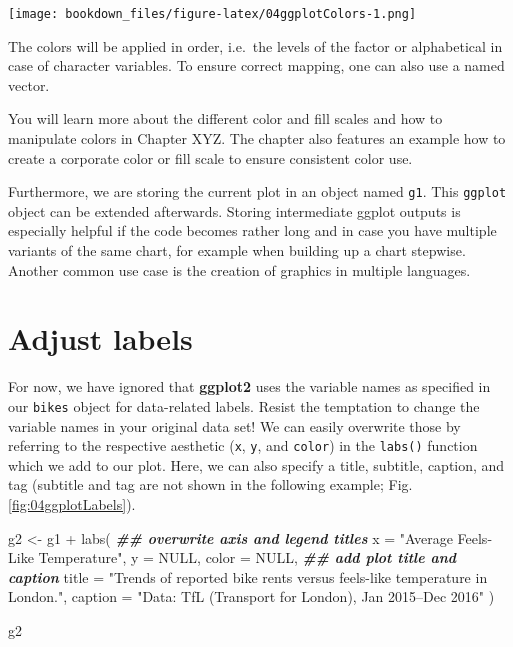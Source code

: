 \documentclass[
]{krantz}
\makeatletter
\newenvironment{Shaded}{\begin{snugshade}}{\end{snugshade}}
\newcommand{\AttributeTok}[1]{\textcolor[rgb]{0.61,0.61,0.61}{#1}}
\newcommand{\ConstantTok}[1]{\textcolor[rgb]{0,0,0}{#1}}
\newcommand{\DocumentationTok}[1]{\textcolor[rgb]{0.37,0.37,0.37}{\textbf{\textit{#1}}}}
\newcommand{\FunctionTok}[1]{\textcolor[rgb]{0,0,0}{#1}}
\newcommand{\NormalTok}[1]{#1}
\newcommand{\OtherTok}[1]{\textcolor[rgb]{0.37,0.37,0.37}{#1}}
\newcommand{\SpecialCharTok}[1]{\textcolor[rgb]{0,0,0}{#1}}
\newcommand{\StringTok}[1]{\textcolor[rgb]{0.5,0.5,0.5}{#1}}
\newenvironment{kframe}{%
\medskip{}
\setlength{\fboxsep}{.8em}
 \def\at@end@of@kframe{}%
 \ifinner\ifhmode%
  \def\at@end@of@kframe{\end{minipage}}%
  \begin{minipage}{\columnwidth}%
 \fi\fi%
 \def\FrameCommand##1{\hskip\@totalleftmargin \hskip-\fboxsep
 \colorbox{shadecolor}{##1}\hskip-\fboxsep
     \hskip-\linewidth \hskip-\@totalleftmargin \hskip\columnwidth}%
 \MakeFramed {\advance\hsize-\width
   \@totalleftmargin\z@ \linewidth\hsize
   \@setminipage}}%
 {\par\unskip\endMakeFramed%
 \at@end@of@kframe}
\renewenvironment{Shaded}{\begin{kframe}}{\end{kframe}}
\makeatother
\begin{document}
\texttt{[image: bookdown\_files/figure-latex/04ggplotColors-1.png]}

The colors will be applied in order, i.e.~the levels of the factor or alphabetical in case of character variables. To ensure correct mapping, one can also use a named vector.

You will learn more about the different color and fill scales and how to manipulate colors in Chapter XYZ. The chapter also features an example how to create a corporate color or fill scale to ensure consistent color use.

Furthermore, we are storing the current plot in an object named \texttt{g1}. This \texttt{ggplot} object can be extended afterwards. Storing intermediate ggplot outputs is especially helpful if the code becomes rather long and in case you have multiple variants of the same chart, for example when building up a chart stepwise. Another common use case is the creation of graphics in multiple languages.

\hypertarget{label-adjustment}{%
\section{Adjust labels}\label{label-adjustment}}

For now, we have ignored that \textbf{ggplot2} uses the variable names as specified in our \texttt{bikes} object for data-related labels. Resist the temptation to change the variable names in your original data set! We can easily overwrite those by referring to the respective aesthetic (\texttt{x}, \texttt{y}, and \texttt{color}) in the \texttt{labs()} function which we add to our plot. Here, we can also specify a title, subtitle, caption, and tag (subtitle and tag are not shown in the following example; Fig. \ref{fig:04ggplotLabels}).

\begin{Shaded}
\begin{Highlighting}[]
\NormalTok{g2 }\OtherTok{\textless{}{-}}\NormalTok{ g1 }\SpecialCharTok{+}
  \FunctionTok{labs}\NormalTok{(}
    \DocumentationTok{\#\# overwrite axis and legend titles}
    \AttributeTok{x =} \StringTok{"Average Feels{-}Like Temperature"}\NormalTok{, }\AttributeTok{y =} \ConstantTok{NULL}\NormalTok{, }\AttributeTok{color =} \ConstantTok{NULL}\NormalTok{,}
    \DocumentationTok{\#\# add plot title and caption}
    \AttributeTok{title =} \StringTok{"Trends of reported bike rents versus feels{-}like temperature in London."}\NormalTok{,}
    \AttributeTok{caption =} \StringTok{"Data: TfL (Transport for London), Jan 2015–Dec 2016"}
\NormalTok{  )}

\NormalTok{g2}
\end{Highlighting}
\end{Shaded}
\end{document}
